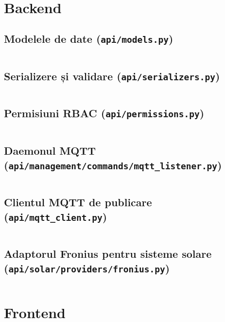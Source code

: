 \appendix

\chapter{Backend}

\section{Modelele de date (\texttt{api/\allowbreak models.py})}
\label{anexa:models}
\inputminted{python}{cod/models.py}

\section{Serializere și validare (\texttt{api/\allowbreak serializers.py})}
\label{anexa:serializers}
\inputminted{python}{cod/serializers.py}

\section{Permisiuni RBAC (\texttt{api/\allowbreak permissions.py})}
\label{anexa:permissions}
\inputminted{python}{cod/permissions.py}

\section{Daemonul MQTT (\texttt{api/\allowbreak management/\allowbreak commands/\allowbreak mqtt\_listener.py})}
\label{anexa:mqtt_listener}
\inputminted{python}{cod/mqtt_listener.py}

\section{Clientul MQTT de publicare (\texttt{api/\allowbreak mqtt\_client.py})}
\label{anexa:mqtt_client}
\inputminted{python}{cod/mqtt_client.py}

\section{Adaptorul Fronius pentru sisteme solare (\texttt{api/\allowbreak solar/\allowbreak providers/\allowbreak fronius.py})}
\label{anexa:fronius}
\inputminted{python}{cod/fronius.py}

\chapter{Frontend}

